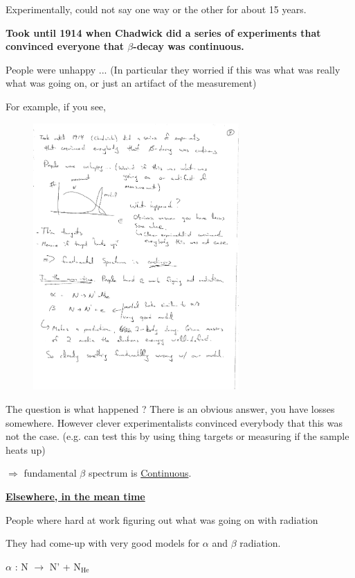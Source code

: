 {Experimentally, could not say one way or the other for about 15 years.

\textbf{Took until 1914 when Chadwick did a series of experiments that convinced everyone that $\beta$-decay was continuous.} 

People were unhappy ... (In particular they worried if this was what was really what was going on, or just an artifact of the measurement)

For example, if you see,

\begin{figure}[h!]
\centering
\includegraphics[width=0.7\textwidth]{./CountsVsE.pdf}
\end{figure}

The question is what happened ? 
There is an obvious answer, you have losses somewhere. 
However clever experimentalists convinced everybody that this was not the case. 
(e.g. can test this by using thing targets or measuring if the sample heats up)  

$\Rightarrow$ fundamental $\beta$ spectrum is \underline{Continuous}.

\textbf{\underline{Elsewhere, in the mean time} }

People where hard at work figuring out what was going on with radiation

They had come-up with very good models for $\alpha$ and $\beta$ radiation. 

\begin{center}
$\alpha$ : N $\rightarrow$ N' + N$_{\textrm{He}}$


\end{center}}
